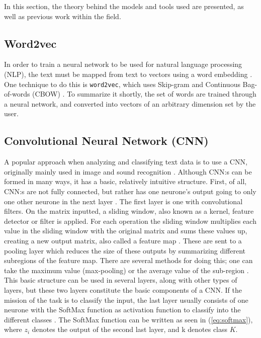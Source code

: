 \documentclass[twocolumn]{article}
\begin{document}
In this section, the theory behind the models and tools used are presented, as well as previous work within the field. 

\subsection{Word2vec}

In order to train a neural network to be used for natural language processing (NLP), the text must be mapped from text to vectors using a word embedding \cite{Lec}. One technique to do this is \verb|word2vec|, which uses Skip-gram and Continuous Bag-of-words (CBOW) \cite{Lec}. To summarize it shortly, the set of words are trained through a neural network, and converted into vectors of an arbitrary dimension set by the user. 

\subsection{Convolutional Neural Network (CNN)}

A popular approach when analyzing and classifying text data is to use a CNN, originally mainly used in image and sound recognition \cite{2018HateSD}. Although CNN:s can be formed in many ways, it has a basic, relatively intuitive structure. First, of all, CNN:s are not fully connected, but rather has one neurone's output going to only one other neurone in the next layer \cite{wildml}. The first layer is one with convolutional filters. On the matrix inputted, a sliding window, also known as a kernel, feature detector or filter is applied. For each operation the sliding window multiplies each value in the sliding window with the original matrix and sums these values up, creating a new output matrix, also called a feature map \cite{wildml}. These are sent to a pooling layer which reduces the size of these outputs by summarizing different subregions of the feature map. There are several methods for doing this; one can take the maximum value (max-pooling) or the average value of the sub-region \cite{dumoulin2016guide}. This basic structure can be used in several layers, along with other types of layers, but these two layers constitute the basic components of a CNN. If the mission of the task is to classify the input, the last layer usually consists of one neurone with the SoftMax function as activation function to classify into the different classes \cite{Lec}. The SoftMax function can be written as seen in (\ref{eq:softmax}), where $z_i$ denotes the output of the second last layer, and k denotes class $K$.
\end{document}

